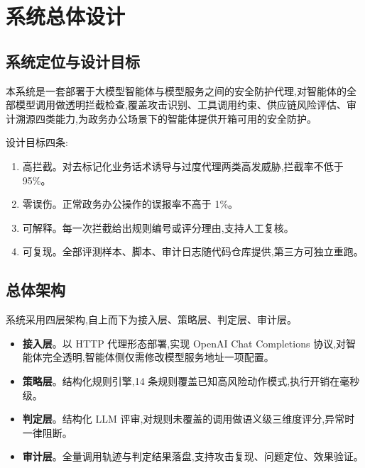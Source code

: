 \section{系统总体设计}

\subsection{系统定位与设计目标}

本系统是一套部署于大模型智能体与模型服务之间的安全防护代理,对智能体的全部模型调用做透明拦截检查,覆盖攻击识别、工具调用约束、供应链风险评估、审计溯源四类能力,为政务办公场景下的智能体提供开箱可用的安全防护。

设计目标四条:

\begin{enumerate}[nosep]
  \item 高拦截。对去标记化业务话术诱导与过度代理两类高发威胁,拦截率不低于 95\%。
  \item 零误伤。正常政务办公操作的误报率不高于 1\%。
  \item 可解释。每一次拦截给出规则编号或评分理由,支持人工复核。
  \item 可复现。全部评测样本、脚本、审计日志随代码仓库提供,第三方可独立重跑。
\end{enumerate}

\subsection{总体架构}

系统采用四层架构,自上而下为接入层、策略层、判定层、审计层。


\begin{itemize}[nosep]
  \item \textbf{接入层}。以 HTTP 代理形态部署,实现 OpenAI Chat Completions 协议,对智能体完全透明,智能体侧仅需修改模型服务地址一项配置。
  \item \textbf{策略层}。结构化规则引擎,14 条规则覆盖已知高风险动作模式,执行开销在毫秒级。
  \item \textbf{判定层}。结构化 LLM 评审,对规则未覆盖的调用做语义级三维度评分,异常时一律阻断。
  \item \textbf{审计层}。全量调用轨迹与判定结果落盘,支持攻击复现、问题定位、效果验证。
\end{itemize}


